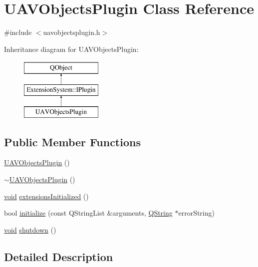 \hypertarget{class_u_a_v_objects_plugin}{\section{U\-A\-V\-Objects\-Plugin Class Reference}
\label{class_u_a_v_objects_plugin}
}


{\ttfamily \#include $<$uavobjectsplugin.\-h$>$}

Inheritance diagram for U\-A\-V\-Objects\-Plugin\-:\begin{figure}[H]
\begin{center}
\leavevmode
\includegraphics[height=3.000000cm]{class_u_a_v_objects_plugin}
\end{center}
\end{figure}
\subsection*{Public Member Functions}
\begin{DoxyCompactItemize}
\item 
\hyperlink{group___u_a_v_objects_plugin_ga2345b6b23fc30557f18422344213a64d}{U\-A\-V\-Objects\-Plugin} ()
\item 
\hyperlink{group___u_a_v_objects_plugin_ga34b24d065eef797812c717bde15e7252}{$\sim$\-U\-A\-V\-Objects\-Plugin} ()
\item 
\hyperlink{group___u_a_v_objects_plugin_ga444cf2ff3f0ecbe028adce838d373f5c}{void} \hyperlink{group___u_a_v_objects_plugin_ga01c0cfcad9946436827836ba293f07b0}{extensions\-Initialized} ()
\item 
bool \hyperlink{group___u_a_v_objects_plugin_ga782e9362e4a727e032c97865d0841820}{initialize} (const Q\-String\-List \&arguments, \hyperlink{group___u_a_v_objects_plugin_gab9d252f49c333c94a72f97ce3105a32d}{Q\-String} $\ast$error\-String)
\item 
\hyperlink{group___u_a_v_objects_plugin_ga444cf2ff3f0ecbe028adce838d373f5c}{void} \hyperlink{group___u_a_v_objects_plugin_gab62f36eaf3f542f980ef1d88c29bd05a}{shutdown} ()
\end{DoxyCompactItemize}


\subsection{Detailed Description}


